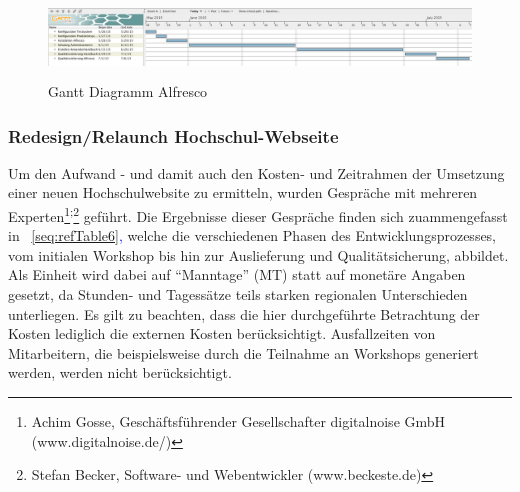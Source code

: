 \documentclass[a4paper]{article}
\begin{document}
\begin{figure}
\centering
\includegraphics[width=15.501cm,height=2.129cm]{INMAusarbeitung02-img/INMAusarbeitung02-img011.png}
\caption[Gantt Diagramm Alfresco]{Gantt Diagramm Alfresco}
\label{seq:refIllustration10}

\end{figure}
\subsubsection[Redesign/Relaunch Hochschul{}-Webseite]{\color{black} Redesign/Relaunch Hochschul-Webseite}
\label{bkm:RefHeading24771162299686}{\sffamily
Um den Aufwand - und damit auch den Kosten- und Zeitrahmen der Umsetzung einer neuen Hochschulwebsite zu ermitteln,
wurden Gespräche mit mehreren Experten\footnote{Achim Gosse, Geschäftsführender Gesellschafter digitalnoise GmbH
(www.digitalnoise.de/)}\textsuperscript{;}\footnote{Stefan Becker, Software- und Webentwickler (www.beckeste.de)}
geführt. Die Ergebnisse dieser Gespräche finden sich zuammengefasst in \tablename~\ref{seq:refTable6}\textcolor{blue}{,
}welche\textcolor{blue}{ }die verschiedenen Phasen des Entwicklungsprozesses, vom initialen Workshop bis hin zur
Auslieferung und Qualitätsicherung, abbildet. Als Einheit wird dabei auf “Manntage” (MT) statt auf monetäre Angaben
gesetzt, da Stunden- und Tagessätze teils starken regionalen Unterschieden unterliegen. Es gilt zu beachten, dass die
hier durchgeführte Betrachtung der Kosten lediglich die externen Kosten berücksichtigt. Ausfallzeiten von Mitarbeitern,
die beispielsweise durch die Teilnahme an Workshops generiert werden, werden nicht berücksichtigt.}


\bigskip
\end{document}
